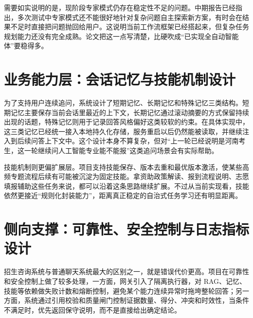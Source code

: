 \documentclass[UTF8,zihao=-4,oneside]{ctexbook}
\numberwithin{equation}{chapter}
\begin{document}
需要如实说明的是，现阶段专家模式仍存在稳定性不足的问题。中期报告已经指出，多次测试中专家模式还不能很好地针对复杂问题自主探索新方案，有时会在结果不足时直接把问题抛回给用户。这说明当前工作流框架已经搭起来，但复杂任务规划能力还没有完全成熟。论文把这一点写清楚，比硬吹成“已实现全自动智能体”要稳得多。

\section{业务能力层：会话记忆与技能机制设计}
为了支持用户连续追问，系统设计了短期记忆、长期记忆和特殊记忆三类结构。短期记忆主要保存当前会话里最近的上下文，长期记忆通过滚动摘要的方式保留持续出现的话题，特殊记忆则用于记录回答风格偏好这类较软的约束。在具体实现中，这三类记忆已经统一接入本地持久化存储，服务重启以后仍然能被读取，并继续注入到后续问答上下文中。这个设计本身不算复杂，但对“上一轮已经说明是河南考生，这一轮继续问人工智能专业能不能报”这类追问场景会有实际帮助。

技能机制则更偏扩展层。项目支持技能保存、版本去重和最优版本激活，使某些高频专题流程后续有可能被沉淀为固定技能。拿资助政策解读、报到流程说明、志愿填报辅助这些任务来说，都可以沿着这条思路继续扩展。不过从当前实现看，技能依然更接近“规则化封装能力”，距离真正稳定的自治式任务学习还有明显距离。

\section{侧向支撑：可靠性、安全控制与日志指标设计}
招生咨询系统与普通聊天系统最大的区别之一，就是错误代价更高。项目在可靠性和安全控制上做了较多处理，一方面，网关引入了隔离执行器，对 RAG、记忆、技能等依赖做失败计数和熔断控制，避免某个能力连续异常时拖垮整轮回答；另一方面，系统通过引用校验和质量闸门控制证据数量、得分、冲突和时效性，当条件不满足时，优先返回保守说明，而不是直接给出确定结论。
\end{document}
